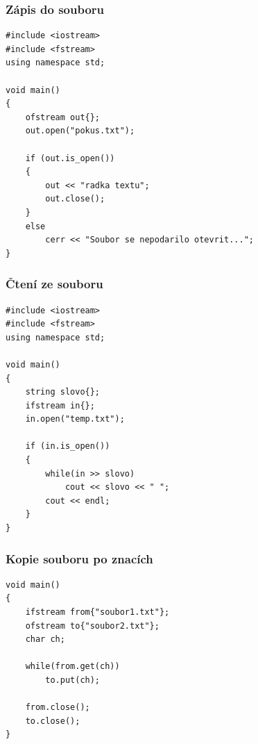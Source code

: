 \begin{frame}[fragile]
\frametitle{Zápis do souboru}
\begin{yesblock}
\begin{lstlisting}[basicstyle=\small]
#include <iostream>
#include <fstream>
using namespace std;

void main()
{ 
	ofstream out{}; 
	out.open("pokus.txt"); 

	if (out.is_open()) 
	{ 
		out << "radka textu"; 
		out.close(); 
	} 
	else 
		cerr << "Soubor se nepodarilo otevrit..."; 
}
\end{lstlisting}
\end{yesblock}
\end{frame}




\begin{frame}[fragile]
\frametitle{Čtení ze souboru}
\begin{yesblock}
\begin{lstlisting}[basicstyle=\small]
#include <iostream>
#include <fstream>
using namespace std;

void main()
{ 
	string slovo{}; 
	ifstream in{}; 
	in.open("temp.txt"); 

	if (in.is_open()) 
	{ 
		while(in >> slovo) 
			cout << slovo << " "; 
		cout << endl; 
	} 
}
\end{lstlisting}
\end{yesblock}
\end{frame}





\begin{frame}[fragile]
\frametitle{Kopie souboru po znacích}
\begin{yesblock}
\begin{lstlisting}[basicstyle=\small]
void main() 
{ 
	ifstream from{"soubor1.txt"}; 
	ofstream to{"soubor2.txt"}; 
	char ch; 

	while(from.get(ch)) 
		to.put(ch); 

	from.close(); 
	to.close(); 
}
\end{lstlisting}
\end{yesblock}
\end{frame}





